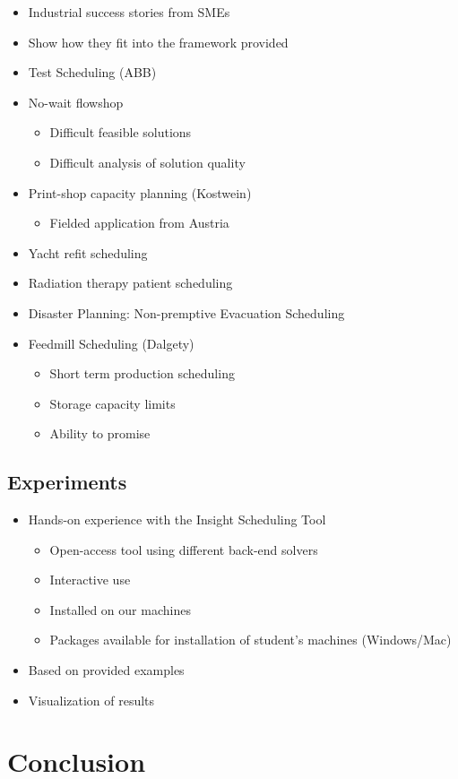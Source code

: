 \documentclass[a4paper]{article}
\begin{document}
\begin{itemize}
\item Industrial success stories from SMEs
\item Show how they fit into the framework provided
\item Test Scheduling (ABB)
\item No-wait flowshop
\begin{itemize}
\item Difficult feasible solutions
\item Difficult analysis of solution quality
\end{itemize}
\item Print-shop capacity planning (Kostwein)
\begin{itemize}
\item Fielded application from Austria
\end{itemize}
\item Yacht refit scheduling
\item Radiation therapy patient scheduling
\item Disaster Planning: Non-premptive Evacuation Scheduling
\item Feedmill Scheduling (Dalgety)
\begin{itemize}
\item Short term production scheduling
\item Storage capacity limits
\item Ability to promise
\end{itemize}
\end{itemize}

\subsection{Experiments}
\begin{itemize}
\item Hands-on experience with the Insight Scheduling Tool
\begin{itemize}
\item Open-access tool using different back-end solvers
\item Interactive use
\item Installed on our machines
\item Packages available for installation of student's machines (Windows/Mac)
\end{itemize}
\item Based on provided examples
\item Visualization of results
\end{itemize}


\section{Conclusion}
\label{sec:conclusion}
\end{document}
